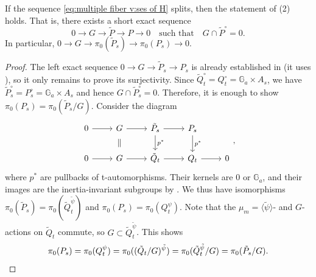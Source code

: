 \documentclass[reqno, letterpaper]{amsart}
\numberwithin{equation}{subsection}
\let\to\longrightarrow
\newcommand{\GG}{\mathbb{G}}
\begin{document}
		\begin{lemma} \label{lem:multiple fiber v:classification of G}
			If the sequence \eqref{eq:multiple fiber v:ses of H} splits, then the statement of (2) holds. That is, there exists a short exact sequence
			\[ 0 \to G \to \tilde P \to P \to 0 \quad\mbox{such that}\quad G \cap \tilde P^\circ = 0 .\]
			In particular, $0 \to G \to \pi_0 (\tilde P_s) \to \pi_0 (P_s) \to 0$.
		\end{lemma}
		\begin{proof}
			The left exact sequence $0 \to G \to \tilde P_s \to P_s$ is already established in  (it uses ), so it only remains to prove its surjectivity. Since $\tilde Q_t^\circ = Q_t^\circ = \GG_a \times A_s$, we have $\tilde P_s^\circ = P_s^\circ = \GG_a \times A_s$ and hence $G \cap \tilde P_s^\circ = 0$. Therefore, it is enough to show $\pi_0 (P_s) = \pi_0 (\tilde P_s/G)$. Consider the diagram
			\[\begin{tikzcd}
				0 \arrow[r] & G \arrow[r] \arrow[d, phantom, "\parallel"] & \tilde P_s \arrow[r] \arrow[d, "p^*"] & P_s \arrow[d, "p^*"] \\
				0 \arrow[r] & G \arrow[r] & \tilde Q_t \arrow[r] & Q_t \arrow[r] & 0
			\end{tikzcd},\]
			where $p^*$ are pullbacks of t-automorphisms. Their kernels are $0$ or $\GG_a$, and their images are the inertia-invariant subgroups by . We thus have isomorphisms $\pi_0(\tilde P_s) = \pi_0(\tilde Q_t^{\tilde \psi})$ and $\pi_0(P_s) = \pi_0(Q_t^\psi)$. Note that the $\mu_m = \langle \tilde \psi \rangle$- and $G$-actions on $\tilde Q_t$ commute, so $G \subset \tilde Q_t^{\tilde \psi}$. This shows
			\[ \pi_0 (P_s) = \pi_0 (Q_t^\psi) = \pi_0 ((\tilde Q_t/G)^{\tilde \psi}) = \pi_0 (\tilde Q_t^{\tilde \psi}/G) = \pi_0 (\tilde P_s/G) .\qedhere\]
		\end{proof}
		
\end{document}
